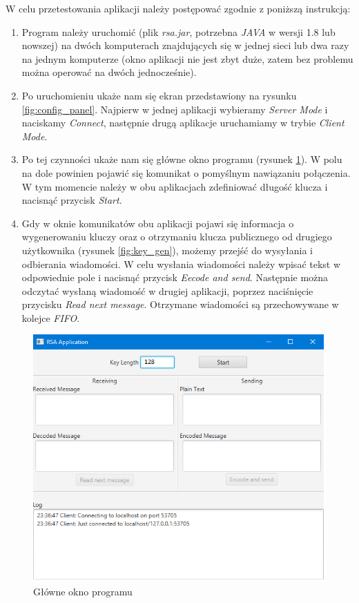 \documentclass[10pt,a4paper]{article}
\begin{document}
W celu przetestowania aplikacji należy postępować zgodnie z poniższą instrukcją:

\begin{enumerate}
\item Program należy uruchomić (plik \textit{rsa.jar}, potrzebna \textit{JAVA} w wersji 1.8 lub nowszej) na dwóch komputerach znajdujących się w jednej sieci lub dwa razy na jednym komputerze (okno aplikacji nie jest zbyt duże, zatem bez problemu można operować na dwóch jednocześnie).

\item Po uruchomieniu ukaże nam się ekran przedstawiony na rysunku \ref{fig:config_panel}. Najpierw w jednej aplikacji wybieramy \textit{Server Mode} i naciskamy \textit{Connect}, następnie drugą aplikacje uruchamiamy w trybie \textit{Client Mode}.

\item Po tej czynności ukaże nam się główne okno programu (rysunek \ref{fig:main_window}). W polu na dole powinien pojawić się komunikat o pomyślnym nawiązaniu połączenia. W tym momencie należy w obu aplikacjach zdefiniować długość klucza i nacisnąć przycisk \textit{Start}.

\item Gdy w oknie komunikatów obu aplikacji pojawi się informacja o wygenerowaniu kluczy oraz o otrzymaniu klucza publicznego od drugiego użytkownika (rysunek \ref{fig:key_gen}), możemy przejść do wysyłania i odbierania wiadomości. W celu wysłania wiadomości należy wpisać tekst w odpowiednie pole i nacisnąć przycisk \textit{Eecode and send}. Następnie można odczytać wysłaną wiadomość w drugiej aplikacji, poprzez naciśnięcie przycisku \textit{Read next message}. Otrzymane wiadomości są przechowywane w kolejce \textit{FIFO}.
\end{enumerate}

\begin{figure}[!t]
	\centering
	\includegraphics[scale=0.85]{img/main_window.png}
	\caption{Główne okno programu}
	\label{fig:main_window}
\end{figure}
\end{document}
